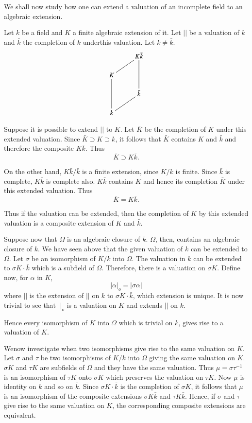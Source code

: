 We shall now study how one can extend a valuation of an incomplete
field to an algebraic extension.  

Let $k$ be a field and $K$ a finite algebraic extension of it. Let
$||$ be a valuation of $k$ and $\bar{k}$ the completion of $k$
under\pageoriginale this valuation. Let $k \neq \bar{k}$.   
\[
\xymatrix@R=0.5cm{
& K\bar{k}\ar@{-}[dd]\ar@{-}[dl]\\
K \ar@{-}[dd] & \\
& \bar{k} \ar@{-}[dl]\\
k & 
}
\]

Suppose it is possible to extend $||$ to $K$. Let $\bar{K}$ be the
completion of $K$ under this extended valuation. Since $\bar{K}
\supset K \supset k$, it follows that $\bar{K}$ contains $K$ and
$\bar{k}$ and therefore the composite $K \bar{k}$. Thus  
$$
\bar{K} \supset K\bar{k}.
$$

On the other hand,  $K \bar{k}/ \bar{k}$ is a finite extension, since
$K/k$ is finite. Since $\bar{k}$ is complete, $K \bar{k}$ is complete
also. $K \bar{k}$ contains $K$ and hence its completion $\bar{K}$
under this extended valuation. Thus  
$$
\bar{K} = K \bar{k}. 
$$

Thus if the valuation can be extended, then the completion of $K$ by
this extended valuation is a composite extension of $K$  and
$\bar{k}$.  

Suppose now that $\Omega$ is an algebraic closure of
$\bar{k}$. $\Omega$, then, contains an algebraic closure of $k$. We
have seen above that the given valuation of $k$ can be extended to
$\Omega$. Let $\sigma$ be an isomorphism of $K/k$ into $\Omega$. The
valuation in $\bar{k}$ can be extended to $\sigma K \cdot \bar{k}$ which
is a subfield of $\Omega$. Therefore, there is a valuation on $\sigma
K$. Define now, for $\alpha$ in $K$, 
$$
| \alpha |_o = | \sigma \alpha | 
$$ 
where $||$ is the extension of $||$ on $k$ to $\sigma K \cdot
\bar{k}$, which extension is unique. It is now trivial to see that
$||_o$ is a valuation on $K$ and extends $||$ on $k$.  

Hence every isomorphism of $K$ into $\Omega$ which is trivial on $k$,
gives rise to a valuation of $K$.  

We\pageoriginale now investigate when two isomorphisms give rise to
the same valuation on $K$. Let $\sigma$ and $\tau$ be two isomorphisms
of $K/k$ into $\Omega$ giving the same valuation on $K$. $\sigma K$
and $\tau K$ are subfields of $\Omega$ and they have the same 
valuation. Thus $\mu = \sigma \tau^{-1}$ is an isomorphism of $\tau K$
onto $\sigma K$ which preserves the valuation on $\tau K$. Now $\mu$
is identity on $k$ and so on $\bar{k}$. Since $\sigma K\cdot \bar{k}$ is
the completion of $\sigma K$, it follows that $\mu$ is an isomorphism
of the composite extensions $\sigma K \bar{k}$ and $\tau K
\bar{k}$. Hence, if $\sigma$ and $\tau$ give rise to the same
valuation on $K$, the corresponding composite extensions are
equivalent.  

